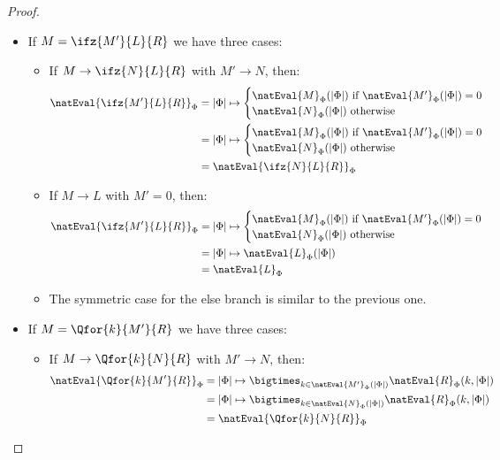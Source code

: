 \begin{proof}
\begin{itemize}
        \item If $M = \ifz{M'}{L}{R}$ we have three cases:
        \begin{itemize}
            \item If $M\to \ifz{N}{L}{R}$ with $M'\to N$, then: 
            \begin{align*}
                \natEval{\ifz{M'}{L}{R}}_\Phi &= |\Phi| \mapsto 
                    \begin{cases}
                    \natEval{M}_\Phi(|\Phi|) \text{ if } \natEval{M'}_\Phi(|\Phi|) = 0 \\
                    \natEval{N}_\Phi(|\Phi|) \text{ otherwise}
                    \end{cases}\\
                &= |\Phi| \mapsto 
                \begin{cases}
                \natEval{M}_\Phi(|\Phi|) \text{ if } \natEval{M'}_\Phi(|\Phi|) = 0 \\
                \natEval{N}_\Phi(|\Phi|) \text{ otherwise}
                \end{cases}\\
                &= \natEval{\ifz{N}{L}{R}}_\Phi
            \end{align*}

            \item If $M\to L$ with $M'= 0$, then: 
            \begin{align*}
                \natEval{\ifz{M'}{L}{R}}_\Phi &= |\Phi| \mapsto 
                \begin{cases}
                \natEval{M}_\Phi(|\Phi|) \text{ if } \natEval{M'}_\Phi(|\Phi|) = 0 \\
                \natEval{N}_\Phi(|\Phi|) \text{ otherwise}
                \end{cases}\\
            &= |\Phi| \mapsto \natEval{L}_\Phi(|\Phi|)\\
            &= \natEval{L}_\Phi
            \end{align*}

            \item The symmetric case for the else branch is similar to the previous one.
        \end{itemize}

        \item If $M = \Qfor{k}{M'}{R}$ we have three cases:
        \begin{itemize}
            \item If $M\to \Qfor{k}{N}{R}$ with $M'\to N$, then: 
            \begin{align*}
                \natEval{\Qfor{k}{M'}{R}}_\Phi &= |\Phi| \mapsto \bigtimes_{k\in \natEval{M'}_\Phi(|\Phi|)} \natEval{R}_\Phi(k, |\Phi|)\\
                &= |\Phi| \mapsto \bigtimes_{k\in \natEval{N}_\Phi(|\Phi|)} \natEval{R}_\Phi(k, |\Phi|)\\
                &= \natEval{\Qfor{k}{N}{R}}_\Phi
            \end{align*}


\end{itemize}
\end{itemize}
\end{proof}
